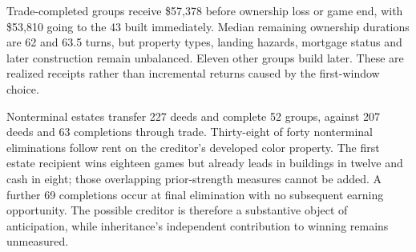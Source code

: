 Trade-completed groups receive \$57,378 before ownership loss or game end, with \$53,810 going to the 43 built immediately. Median remaining ownership durations are 62 and 63.5 turns, but property types, landing hazards, mortgage status and later construction remain unbalanced. Eleven other groups build later. These are realized receipts rather than incremental returns caused by the first-window choice.

Nonterminal estates transfer 227 deeds and complete 52 groups, against 207 deeds and 63 completions through trade. Thirty-eight of forty nonterminal eliminations follow rent on the creditor's developed color property. The first estate recipient wins eighteen games but already leads in buildings in twelve and cash in eight; those overlapping prior-strength measures cannot be added. A further 69 completions occur at final elimination with no subsequent earning opportunity. The possible creditor is therefore a substantive object of anticipation, while inheritance's independent contribution to winning remains unmeasured.
